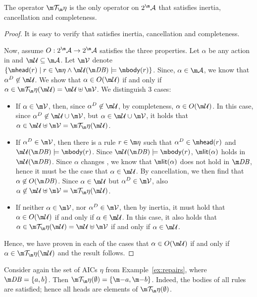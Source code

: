 \begin{proposition}
 The operator $\Op$ is the only operator on $2^\acts$ that satisfies inertia, cancellation and completeness. 
\end{proposition}
\begin{proof}
 It is easy to verify that \Op satisfies inertia, cancellation and completeness.
 

 Now, assume $O: 2^\acts \to 2^\acts$ satisfies the three properties. Let $\alpha$ be any action in \acts and $\UU\subseteq \acts$. 
 Let $\VV$ denote $\{\head(r)\mid r\in \aics \land \UU(\db)\models\body(r)\}$. 
 Since, $\alpha \in \acts$, we know that $\alpha^D\not \in \UU$. We show that $\alpha \in O(\UU)$ if and only if $\alpha \in \Op(\UU) = \UU\uplus \VV $. 
 We distinguish 3 cases:
 \begin{itemize}
  \item If $\alpha \in \VV$, then, since $\alpha^D\not\in \UU$, by completeness, $\alpha \in O(\UU)$. In this case, since $\alpha^D\not \in \UU\cup \VV$, but $\alpha \in \UU\cup\VV$, it holds that $\alpha \in \UU \uplus \VV = \Op(\UU)$. 
  \item If $\alpha^D \in \VV$, then there is a rule $r\in \aics$ such that $\alpha^D\in \head(r)$ and $\UU(\db)\models \body(r)$. Since $\UU(\db)\models \body(r)$, $\litof(\alpha)$ holds in $\UU(\db)$. Since $\alpha$ changes \db, we know that $\litof(\alpha)$ does not hold in $\db$, hence it must be the case that $\alpha \in \UU$. By cancellation, we then find that $\alpha\not\in O(\db)$. Since $\alpha \in \UU$ but $\alpha^D\in \VV$, also $\alpha\not\in \UU\uplus\VV=\Op(\UU)$.
  \item If neither $\alpha\in\VV$, nor $\alpha^D\in\VV$, then by inertia, it must hold that $\alpha \in O(\UU)$ if and only if $\alpha\in \UU$. In this case, it also holds that $\alpha \in \Op(\UU) = \UU \uplus\VV$ if and only if $\alpha \in \UU$.
  \end{itemize}
  Hence, we have proven in each of the cases that $\alpha \in O(\UU)$ if and only if $\alpha \in \Op(\UU)$ and the result follows. 
\end{proof}



\begin{example}
  Consider again the set of AICs $\eta$ from Example~\ref{ex:repairs}, where
  $\db=\{a,b\}$.
  Then $\Op(\emptyset)=\{\remove a, \remove b\}$. Indeed, the bodies of all rules are satisfied; hence all heads are elements of $\Op(\emptyset)$.
\end{example}

